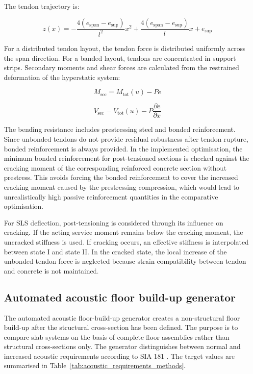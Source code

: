 \noindent The tendon trajectory is:

\[
    z(x)
    =
    -\frac{4(e_{\mathrm{span}}-e_{\mathrm{sup}})}{l^2}x^2
    +
    \frac{4(e_{\mathrm{span}}-e_{\mathrm{sup}})}{l}x
    +
    e_{\mathrm{sup}}
\]

\noindent For a distributed tendon layout, the tendon force is distributed uniformly across the span direction. For a banded layout, tendons are concentrated in support strips. Secondary moments and shear forces are calculated from the restrained deformation of the hyperstatic system:

\[
    M_{\mathrm{sec}} = M_{\mathrm{tot}}(u) - P e
\]

\[
    V_{\mathrm{sec}} = V_{\mathrm{tot}}(u) - P \frac{\partial e}{\partial x}
\]

\noindent The bending resistance includes prestressing steel and bonded reinforcement. Since unbonded tendons do not provide residual robustness after tendon rupture, bonded reinforcement is always provided. In the implemented optimisation, the minimum bonded reinforcement for post-tensioned sections is checked against the cracking moment of the corresponding reinforced concrete section without prestress. This avoids forcing the bonded reinforcement to cover the increased cracking moment caused by the prestressing compression, which would lead to unrealistically high passive reinforcement quantities in the comparative optimisation.

\noindent For SLS deflection, post-tensioning is considered through its influence on cracking. If the acting service moment remains below the cracking moment, the uncracked stiffness is used. If cracking occurs, an effective stiffness is interpolated between state I and state II. In the cracked state, the local increase of the unbonded tendon force is neglected because strain compatibility between tendon and concrete is not maintained.

\subsection{Automated acoustic floor build-up generator}

The automated acoustic floor-build-up generator creates a non-structural floor build-up after the structural cross-section has been defined. The purpose is to compare slab systems on the basis of complete floor assemblies rather than structural cross-sections only. The generator distinguishes between normal and increased acoustic requirements according to SIA 181 \cite{SIA181_2020}. The target values are summarised in Table~\ref{tab:acoustic_requirements_methods}.


